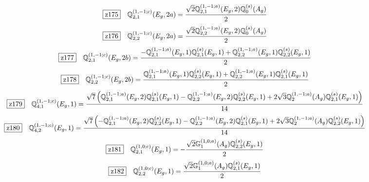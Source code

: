 \documentclass[fleqn,10pt,landscape]{jsarticle}
\begin{document}
\begin{dmath*}
\hspace*{3mm}\fbox{z175}\quad \mathbb{Q}_{2,1}^{(1,-1;c)}(E_{g},2a)=\frac{\sqrt{2} \mathbb{Q}_{2,1}^{(1,-1;a)}(E_{g},2) \mathbb{Q}_{0}^{(s)}(A_{g})}{2}
\end{dmath*}
\begin{dmath*}
\hspace*{3mm}\fbox{z176}\quad \mathbb{Q}_{2,2}^{(1,-1;c)}(E_{g},2a)=\frac{\sqrt{2} \mathbb{Q}_{2,2}^{(1,-1;a)}(E_{g},2) \mathbb{Q}_{0}^{(s)}(A_{g})}{2}
\end{dmath*}
\begin{dmath*}
\hspace*{3mm}\fbox{z177}\quad \mathbb{Q}_{2,1}^{(1,-1;c)}(E_{g},2b)=\frac{- \mathbb{Q}_{2,1}^{(1,-1;a)}(E_{g},1) \mathbb{Q}_{2,1}^{(s)}(E_{g},1) + \mathbb{Q}_{2,2}^{(1,-1;a)}(E_{g},1) \mathbb{Q}_{2,2}^{(s)}(E_{g},1)}{2}
\end{dmath*}
\begin{dmath*}
\hspace*{3mm}\fbox{z178}\quad \mathbb{Q}_{2,2}^{(1,-1;c)}(E_{g},2b)=\frac{\mathbb{Q}_{2,1}^{(1,-1;a)}(E_{g},1) \mathbb{Q}_{2,2}^{(s)}(E_{g},1) + \mathbb{Q}_{2,2}^{(1,-1;a)}(E_{g},1) \mathbb{Q}_{2,1}^{(s)}(E_{g},1)}{2}
\end{dmath*}
\begin{dmath*}
\hspace*{3mm}\fbox{z179}\quad \mathbb{Q}_{4,1}^{(1,-1;c)}(E_{g},1)=\frac{\sqrt{7} \left(\mathbb{Q}_{2,1}^{(1,-1;a)}(E_{g},2) \mathbb{Q}_{2,1}^{(s)}(E_{g},1) - \mathbb{Q}_{2,2}^{(1,-1;a)}(E_{g},2) \mathbb{Q}_{2,2}^{(s)}(E_{g},1) + 2 \sqrt{3} \mathbb{Q}_{2}^{(1,-1;a)}(A_{g}) \mathbb{Q}_{2,1}^{(s)}(E_{g},1)\right)}{14}
\end{dmath*}
\begin{dmath*}
\hspace*{3mm}\fbox{z180}\quad \mathbb{Q}_{4,2}^{(1,-1;c)}(E_{g},1)=\frac{\sqrt{7} \left(- \mathbb{Q}_{2,1}^{(1,-1;a)}(E_{g},2) \mathbb{Q}_{2,2}^{(s)}(E_{g},1) - \mathbb{Q}_{2,2}^{(1,-1;a)}(E_{g},2) \mathbb{Q}_{2,1}^{(s)}(E_{g},1) + 2 \sqrt{3} \mathbb{Q}_{2}^{(1,-1;a)}(A_{g}) \mathbb{Q}_{2,2}^{(s)}(E_{g},1)\right)}{14}
\end{dmath*}
\begin{dmath*}
\hspace*{3mm}\fbox{z181}\quad \mathbb{Q}_{2,1}^{(1,0;c)}(E_{g},1)=- \frac{\sqrt{2} \mathbb{G}_{1}^{(1,0;a)}(A_{g}) \mathbb{Q}_{2,2}^{(s)}(E_{g},1)}{2}
\end{dmath*}
\begin{dmath*}
\hspace*{3mm}\fbox{z182}\quad \mathbb{Q}_{2,2}^{(1,0;c)}(E_{g},1)=\frac{\sqrt{2} \mathbb{G}_{1}^{(1,0;a)}(A_{g}) \mathbb{Q}_{2,1}^{(s)}(E_{g},1)}{2}
\end{dmath*}
\end{document}
